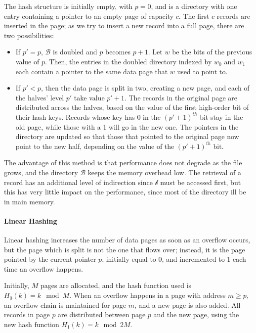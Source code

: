 The hash structure is initially empty, with $p=0$, and is a directory with one entry containing a pointer to an empty page of capacity $c$. The first $c$ records are inserted in the page; as we try to insert a new record into a full page, there are two possibilities:
\begin{itemize}
    \item If $p' = p$, $\mathcal{B}$ is doubled and $p$ becomes $p+1$. Let $w$ be the bits of the previous value of $p$. Then, the entries in the doubled directory indexed by $w_0$ and $w_1$ each contain a pointer to the same data page that $w$ used to point to.

    \item If $p' < p$, then the data page is split in two, creating a new page, and each of the halves' level $p'$ take value $p'+1$. The records in the original page are distributed across the halves, based on the value of the first high-order bit of their hash keys. Records whose key has 0 in the $(p'+1)^{th}$ bit stay in the old page, while those with a 1 will go in the new one. The pointers in the directory are updated so that those that pointed to the original page now point to the new half, depending on the value of the $(p'+1)^{th}$ bit.
\end{itemize}
The advantage of this method is that performance does not degrade as the file grows, and the directory $\mathcal{B}$ keeps the memory overhead low. The retrieval of a record has an additional level of indirection since $\mathcal{b}$ must be accessed first, but this has very little impact on the performance, since most of the directory ill be in main memory.

\paragraph{Linear Hashing}

Linear hashing increases the number of data pages as soon as an overflow occurs, but the page which is split is not the one that flows over; instead, it is the page pointed by the current pointer $p$, initially equal to 0, and incremented to 1 each time an overflow happens.

Initially, $M$ pages are allocated, and the hash function used is $H_0(k) = k \mod M$. When an overflow happens in a page with address $m \geq p$, an overflow chain is maintained for page $m$, and a new page is also added. All records in page $p$ are distributed between page $p$ and the new page, using the new hash function $H_1(k) = k \mod 2M$.

